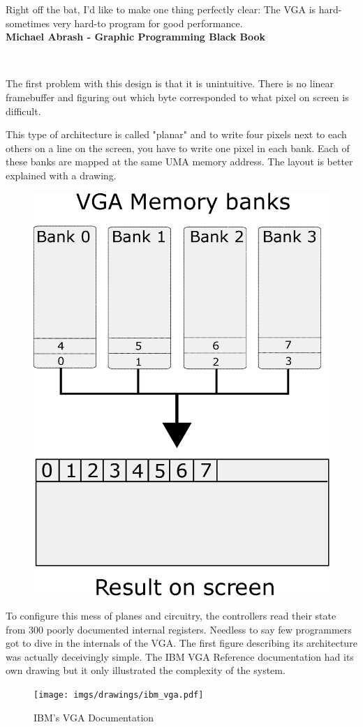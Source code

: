 \documentclass[book.tex]{subfiles}
\begin{document}
 \begin{fancyquotes}
   Right off the bat, I'd like to make one thing perfectly clear: The VGA is hard-sometimes very hard-to program for good performance.
 \bigskip \\
\textbf{Michael Abrash - Graphic Programming Black Book}
 \end{fancyquotes}
 \\
\par
The first problem with this design is that it is unintuitive. There is no linear framebuffer and figuring out which byte corresponded to what pixel on screen is difficult.\\
\par
 This type of architecture is called "planar" and to write four pixels next to each others on a line on the screen, you have to write one pixel in each bank. Each of these banks are mapped at the same UMA memory address. The layout is better explained with a drawing.\\
\par
\begin{figure}[H]
\centering
\includegraphics[width=.5\textwidth]{imgs/drawings/vga_ram_screen_layout.eps}
\label{fig:vga_arch}
\end{figure}

 

\par
To configure this mess of planes and circuitry, the controllers read their state from 300 poorly documented internal registers. Needless to say few programmers got to dive in the internals of the VGA. The first figure describing its architecture was actually deceivingly simple. The IBM VGA Reference documentation had its own drawing but it only illustrated the complexity of the system.\\
 \begin{figure}[H]
\centering
\texttt{[image: imgs/drawings/ibm\_vga.pdf]}
\caption{IBM's VGA Documentation}
\label{fig:ibm_vga}
\end{figure}
\end{document}
